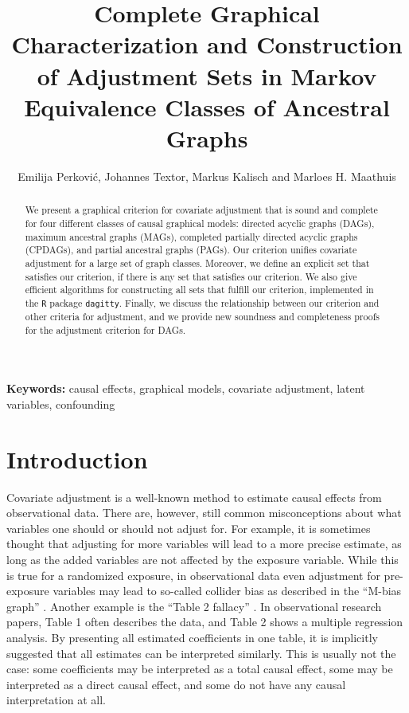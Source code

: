 \documentclass[11pt,a4paper]{article}
\begin{document}
\title{Complete Graphical Characterization and Construction of Adjustment Sets in Markov Equivalence Classes of Ancestral Graphs}
\author{Emilija Perkovi\'c, Johannes Textor, Markus Kalisch and Marloes H. Maathuis}
\date{}

\maketitle

\begin{abstract}
We present a graphical criterion for covariate adjustment that is sound and complete for four
different classes of causal graphical models: directed acyclic graphs (DAGs), maximum ancestral graphs (MAGs),
completed partially directed
acyclic graphs (CPDAGs), and partial ancestral
graphs (PAGs). Our criterion unifies covariate adjustment for a large set of graph classes.
Moreover, we define an explicit set that satisfies our criterion, if there is any set that satisfies our criterion. We also give
efficient algorithms for constructing all sets that fulfill our criterion, implemented in the \texttt{R} package \texttt{dagitty}.
Finally, we discuss the relationship between our criterion and other criteria for adjustment, and we provide new soundness and completeness proofs
for the adjustment criterion for DAGs.
\end{abstract}

\noindent{}\textbf{Keywords:} causal effects, graphical models, covariate adjustment, latent variables, confounding


\section{Introduction} \label{sec:intro}


Covariate adjustment is a well-known method to estimate causal effects from observational data. 
There are, however, still common misconceptions about what variables one should or should not adjust for.
 For example,
it is sometimes thought that adjusting for more variables will lead to a more precise estimate, as long as the added variables are not affected by the exposure variable.  While this is true for a randomized exposure, in observational data even adjustment for pre-exposure variables may lead to so-called collider bias as described in the ``M-bias graph'' \citep{Shrier2008,Rubin2008}. 
Another example is the ``Table 2 fallacy'' \citep{Westreich2013}. In observational research papers, Table 1 often describes the data, and Table 2
shows a multiple regression analysis. By presenting all estimated coefficients in one table, it is implicitly suggested that all estimates
can be interpreted similarly. This is usually not the case: some coefficients may be interpreted as a total causal effect, some may be
interpreted as a direct causal effect, and some do not have any causal interpretation at all.
\end{document}
